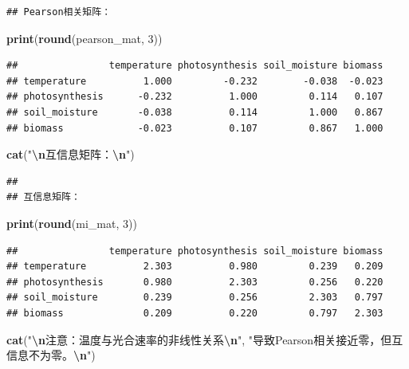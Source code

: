 \documentclass[
  twoside,12pt,fontset=none]{ctexbook}
\newenvironment{Shaded}{\begin{snugshade}}{\end{snugshade}}
\newcommand{\DecValTok}[1]{\textcolor[rgb]{0.00,0.00,0.81}{#1}}
\newcommand{\FunctionTok}[1]{\textcolor[rgb]{0.13,0.29,0.53}{\textbf{#1}}}
\newcommand{\NormalTok}[1]{#1}
\newcommand{\SpecialCharTok}[1]{\textcolor[rgb]{0.81,0.36,0.00}{\textbf{#1}}}
\newcommand{\StringTok}[1]{\textcolor[rgb]{0.31,0.60,0.02}{#1}}
\begin{document}
\begin{verbatim}
## Pearson相关矩阵：
\end{verbatim}

\begin{Shaded}
\begin{Highlighting}[]
\FunctionTok{print}\NormalTok{(}\FunctionTok{round}\NormalTok{(pearson\_mat, }\DecValTok{3}\NormalTok{))}
\end{Highlighting}
\end{Shaded}

\begin{verbatim}
##                temperature photosynthesis soil_moisture biomass
## temperature          1.000         -0.232        -0.038  -0.023
## photosynthesis      -0.232          1.000         0.114   0.107
## soil_moisture       -0.038          0.114         1.000   0.867
## biomass             -0.023          0.107         0.867   1.000
\end{verbatim}

\begin{Shaded}
\begin{Highlighting}[]
\FunctionTok{cat}\NormalTok{(}\StringTok{"}\SpecialCharTok{\textbackslash{}n}\StringTok{互信息矩阵：}\SpecialCharTok{\textbackslash{}n}\StringTok{"}\NormalTok{)}
\end{Highlighting}
\end{Shaded}

\begin{verbatim}
## 
## 互信息矩阵：
\end{verbatim}

\begin{Shaded}
\begin{Highlighting}[]
\FunctionTok{print}\NormalTok{(}\FunctionTok{round}\NormalTok{(mi\_mat, }\DecValTok{3}\NormalTok{))}
\end{Highlighting}
\end{Shaded}

\begin{verbatim}
##                temperature photosynthesis soil_moisture biomass
## temperature          2.303          0.980         0.239   0.209
## photosynthesis       0.980          2.303         0.256   0.220
## soil_moisture        0.239          0.256         2.303   0.797
## biomass              0.209          0.220         0.797   2.303
\end{verbatim}

\begin{Shaded}
\begin{Highlighting}[]
\FunctionTok{cat}\NormalTok{(}\StringTok{"}\SpecialCharTok{\textbackslash{}n}\StringTok{注意：温度与光合速率的非线性关系}\SpecialCharTok{\textbackslash{}n}\StringTok{"}\NormalTok{,}
    \StringTok{"导致Pearson相关接近零，但互信息不为零。}\SpecialCharTok{\textbackslash{}n}\StringTok{"}\NormalTok{)}
\end{Highlighting}
\end{Shaded}
\end{document}

